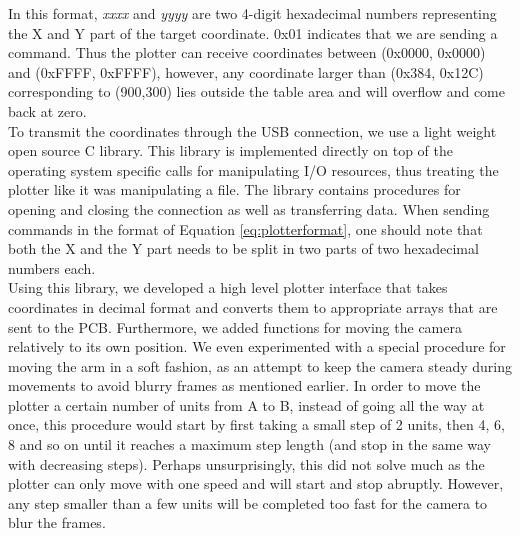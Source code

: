 In this format, \textit{xxxx} and \textit{yyyy} are two 4-digit hexadecimal numbers representing the X and Y part of the target coordinate. 0x01 indicates that we are sending a command. Thus the plotter can receive coordinates between (0x0000, 0x0000) and (0xFFFF, 0xFFFF), however, any coordinate larger than (0x384, 0x12C) corresponding to (900,300) lies outside the table area and will overflow and come back at zero. \\

To transmit the coordinates through the USB connection, we use a light weight open source C library. This library is implemented directly on top of the operating system specific calls for manipulating I/O resources, thus treating the plotter like it was manipulating a file. The library contains procedures for opening and closing the connection as well as transferring data. When sending commands in the format of Equation \ref{eq:plotterformat}, one should note that both the X and the Y part needs to be split in two parts of two hexadecimal numbers each. \\

Using this library, we developed a high level plotter interface that takes coordinates in decimal format and converts them to appropriate arrays that are sent to the PCB. Furthermore, we added functions for moving the camera relatively to its own position. We even experimented with a special procedure for moving the arm in a soft fashion, as an attempt to keep the camera steady during movements to avoid blurry frames as mentioned earlier. In order to move the plotter a certain number of units from A to B, instead of going all the way at once, this procedure would start by first taking a small step of 2 units, then 4, 6, 8 and so on until it reaches a maximum step length (and stop in the same way with decreasing steps). Perhaps unsurprisingly, this did not solve much as the plotter can only move with one speed and will start and stop abruptly. However, any step smaller than a few units will be completed too fast for the camera to blur the frames.


